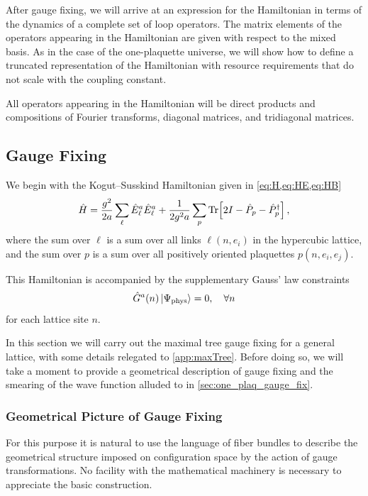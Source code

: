 \documentclass[reprint,superscriptaddress,pra,nofootinbib,preprintnumbers,floatfix]{revtex4-1}
\begin{document}
After gauge fixing, we will arrive at an expression for the Hamiltonian in terms of the dynamics of a complete set of loop operators. 
%
The matrix elements of the operators appearing in the Hamiltonian are given with respect to the mixed basis. 
%
As in the case of the one-plaquette universe, we will show how to define a truncated representation of the Hamiltonian with resource requirements that do not scale with the coupling constant. 
%


All operators appearing in the Hamiltonian will be direct products and compositions of Fourier transforms, diagonal matrices, and tridiagonal matrices.

\subsection{Gauge Fixing}
We begin with the Kogut--Susskind Hamiltonian given in \cref{eq:H,eq:HE,eq:HB}
%
\begin{equation}
    \hat{H} = \frac{g^2}{2a} \sum_\ell \hat{E}^a_\ell \hat{E}^a_\ell
            + \frac{1}{2g^2 a} \sum_p \Tr[2I - \hat{P}_p - \hat{P}_p^\dagger] \,,
\end{equation}
%
where the sum over $\ell$ is a sum over all links $\ell(n,e_i)$ in the hypercubic lattice, and the sum over $p$ is a sum over all positively oriented plaquettes $p(n,e_i,e_j)$.  

This Hamiltonian is accompanied by the supplementary Gauss' law constraints
%
\begin{equation}
    \hat{G}^a(n) \ket{\Psi_\text{phys}} = 0 \qc \forall n
\end{equation}
%
for each lattice site $n$. 

In this section we will carry out the maximal tree gauge fixing for a general lattice, with some details relegated to \cref{app:maxTree}. 
%
Before doing so, we will take a moment to provide a geometrical description of gauge fixing and the smearing of the wave function alluded to in \cref{sec:one_plaq_gauge_fix}. 



\subsubsection{Geometrical Picture of Gauge Fixing}\label{sec:geometry}

For this purpose it is natural to use the language of fiber bundles to describe the geometrical structure imposed on configuration space by the action of gauge transformations. 
%
No facility with the mathematical machinery is necessary to appreciate the basic construction.
\end{document}
